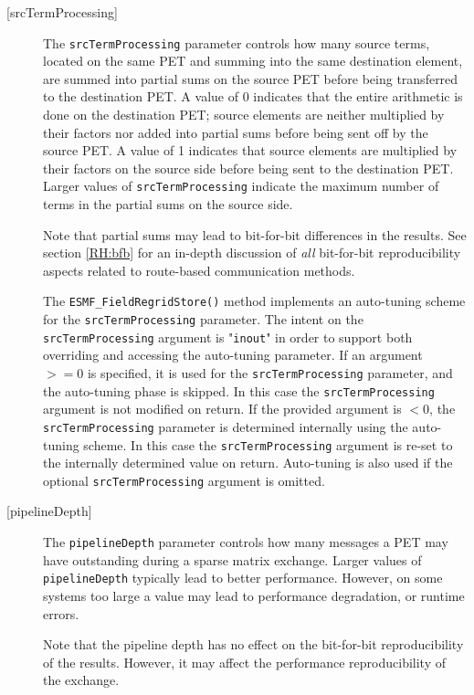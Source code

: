 \begin{description}
   \item [{[srcTermProcessing]}]
   The {\tt srcTermProcessing} parameter controls how many source terms,
   located on the same PET and summing into the same destination element,
   are summed into partial sums on the source PET before being transferred
   to the destination PET. A value of 0 indicates that the entire arithmetic
   is done on the destination PET; source elements are neither multiplied
   by their factors nor added into partial sums before being sent off by the
   source PET. A value of 1 indicates that source elements are multiplied
   by their factors on the source side before being sent to the destination
   PET. Larger values of {\tt srcTermProcessing} indicate the maximum number
   of terms in the partial sums on the source side.
  
   Note that partial sums may lead to bit-for-bit differences in the results.
   See section \ref{RH:bfb} for an in-depth discussion of {\em all}
   bit-for-bit reproducibility aspects related to route-based communication
   methods.
  
   \begin{sloppypar}
   The {\tt ESMF\_FieldRegridStore()} method implements an auto-tuning scheme
   for the {\tt srcTermProcessing} parameter. The intent on the
   {\tt srcTermProcessing} argument is "{\tt inout}" in order to
   support both overriding and accessing the auto-tuning parameter.
   If an argument $>= 0$ is specified, it is used for the
   {\tt srcTermProcessing} parameter, and the auto-tuning phase is skipped.
   In this case the {\tt srcTermProcessing} argument is not modified on
   return. If the provided argument is $< 0$, the {\tt srcTermProcessing}
   parameter is determined internally using the auto-tuning scheme. In this
   case the {\tt srcTermProcessing} argument is re-set to the internally
   determined value on return. Auto-tuning is also used if the optional
   {\tt srcTermProcessing} argument is omitted.
   \end{sloppypar}
  
   \item [{[pipelineDepth]}]
   The {\tt pipelineDepth} parameter controls how many messages a PET
   may have outstanding during a sparse matrix exchange. Larger values
   of {\tt pipelineDepth} typically lead to better performance. However,
   on some systems too large a value may lead to performance degradation,
   or runtime errors.
  
   Note that the pipeline depth has no effect on the bit-for-bit
   reproducibility of the results. However, it may affect the performance
   reproducibility of the exchange.
  

\end{description}
